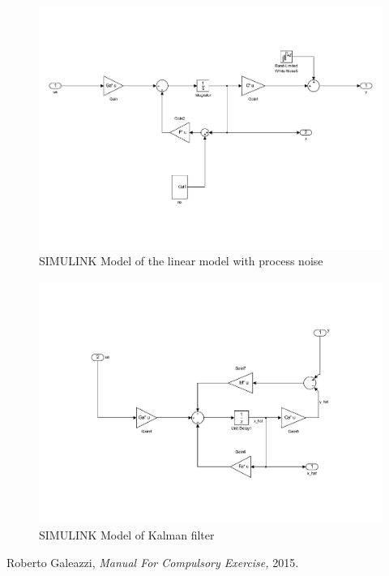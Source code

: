 \documentclass[12pt,a4paper,fleqn, onesside]{report}
\begin{document}
\begin{figure}[H]
 \centering 
 \includegraphics[trim=0cm 0cm 2cm 0cm, clip=true, totalheight=0.35\textheight, angle=0]{figures/modelP22_1.pdf}
 \caption{SIMULINK Model of the linear model with process noise}
\end{figure}

\begin{figure}[H]
 \centering 
 \includegraphics[trim=1cm 0cm 2cm 0cm, clip=true, totalheight=0.35\textheight, angle=0]{figures/modelP22_2.pdf}
 \caption{SIMULINK Model of Kalman filter}
\end{figure}


  \begin{thebibliography}{1}
	 Roberto Galeazzi, {\em Manual For Compulsory Exercise,}  2015.
  \end{thebibliography}
\end{document}
